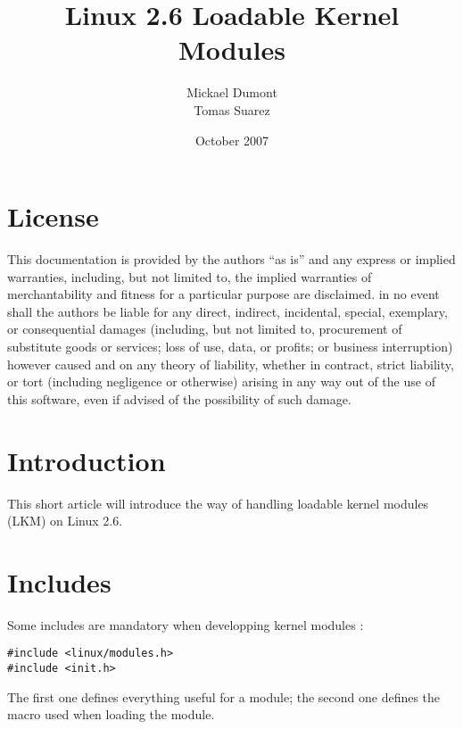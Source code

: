 \documentclass{article}
\title{Linux 2.6 Loadable Kernel Modules}
\author{Mickael Dumont\\Tomas Suarez}
\date{October 2007}
\begin{document}
\pagestyle{plain}

\maketitle
\newpage
\tableofcontents
\newpage

\section{License}
This documentation is provided by the authors ``as is'' and any
express or implied warranties, including, but not limited to, the implied
warranties of merchantability and fitness for a particular purpose are
disclaimed. in no event shall the authors be liable for any
direct, indirect, incidental, special, exemplary, or consequential damages
(including, but not limited to, procurement of substitute goods or services;
loss of use, data, or profits; or business interruption) however caused and
on any theory of liability, whether in contract, strict liability, or tort
(including negligence or otherwise) arising in any way out of the use of this
software, even if advised of the possibility of such damage.

\section{Introduction}
This short article will introduce the way of handling
loadable kernel modules (LKM) on Linux 2.6.

\section{Includes}
Some includes are mandatory when developping kernel modules :
\begin{lstlisting}
#include <linux/modules.h>
#include <init.h>
\end{lstlisting}
The first one defines everything useful for a module;
the second one defines the macro used when loading the module.
\end{document}
